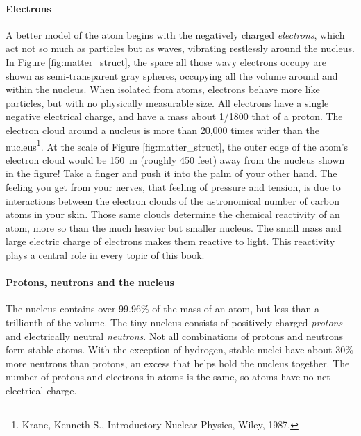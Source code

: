 \paragraph{Electrons}
A better model of the atom begins with the negatively charged \emph{electrons}, which act not so much as particles but as waves, vibrating restlessly around the nucleus. In Figure \ref{fig:matter_struct}, the space all those wavy electrons occupy are shown as semi-transparent gray spheres, occupying all the volume around and within the nucleus. When isolated from atoms, electrons behave more like particles, but with no physically measurable size. All electrons have a single negative electrical charge, and have a mass about 1/1800 that of a proton. The electron cloud around a nucleus is more than 20,000 times wider than the nucleus\footnote{Krane, Kenneth S., Introductory Nuclear Physics, Wiley, 1987.}. At the scale of Figure \ref{fig:matter_struct}, the outer edge of the atom's electron cloud would be \SI{150}{m} (roughly 450 feet) away from the nucleus shown in the figure! Take a finger and push it into the palm of your other hand. The feeling you get from your nerves, that feeling of pressure and tension, is due to interactions between the electron clouds of the astronomical number of carbon atoms in your skin. Those same clouds determine the chemical reactivity of an atom, more so than the much heavier but smaller nucleus. The small mass and large electric charge of electrons makes them reactive to light. This reactivity plays a central role in every topic of this book. 

\paragraph{Protons, neutrons and the nucleus}
The nucleus contains over 99.96\% of the mass of an atom, but less than a trillionth of the volume. The tiny nucleus consists of positively charged \emph{protons} and electrically neutral \emph{neutrons}. Not all combinations of protons and neutrons form stable atoms. With the exception of hydrogen, stable nuclei have about 30\% more neutrons than protons, an excess that helps hold the nucleus together. The number of protons and electrons in atoms is the same, so atoms have no net electrical charge.\\
